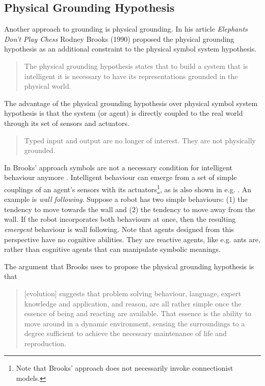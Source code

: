 \subsection{Physical Grounding Hypothesis}\label{s:theory:pgh}

Another approach to grounding is physical grounding. In his article {\em Elephants Don't Play Chess} Rodney Brooks (1990) proposed the physical grounding hypothesis as an additional constraint to the physical symbol system hypothesis. 


\begin{quote}
The physical grounding hypothesis states that to build a system that is intelligent it is necessary to have its representations grounded in the physical world. \citep{brooks:1990}
\end{quote}

The advantage of the physical grounding hypothesis over physical symbol system hypothesis is that the system (or agent) is directly coupled to the real world through its set of sensors and actuators. 

\begin{quote}
Typed input and output are no longer of interest. They are not physically grounded. \citep{brooks:1990}
\end{quote}

In Brooks' approach symbols are not a necessary condition for intelligent behaviour anymore \citep{brooks:1990,brooks:1991}. Intelligent behaviour can emerge from a set of simple couplings of an agent's sensors with its actuators\footnote{Note that Brooks' approach does not necessarily invoke connectionist models.}, as is also shown in e.g. \citep{steelsbrooks:1993,steels:1994,steels:1996c}. An example is {\em wall following}. Suppose a robot has two simple behaviours: (1) the tendency to move towards the wall and (2) the tendency to move away from the wall. If the robot incorporates both behaviours at once, then the resulting {\em emergent} behaviour is wall following. Note that agents designed from this perspective have no cognitive abilities. They are reactive agents, like e.g. ants are, rather than cognitive agents that can manipulate symbolic meanings.

The argument that Brooks uses to propose the physical grounding hypothesis is that

\begin{quote}
[evolution] suggests that problem solving behaviour, language, expert knowledge and application, and reason, are all rather simple once the essence of being and reacting are available. That essence is the ability to move around in a dynamic environment, sensing the surroundings to a degree sufficient to achieve the necessary maintenance of life and reproduction. \citep{brooks:1990}
\end{quote}

